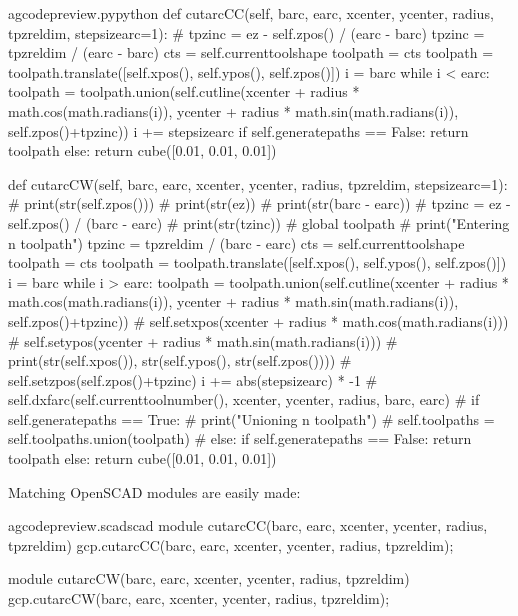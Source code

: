 \documentclass{ltxdoc}
\begin{document}
\lstset{firstnumber=\thegcpy}
\begin{writecode}{a}{gcodepreview.py}{python}
    def cutarcCC(self, barc, earc, xcenter, ycenter, radius, tpzreldim, stepsizearc=1):
#        tpzinc = ez - self.zpos() / (earc - barc)
        tpzinc = tpzreldim / (earc - barc)
        cts = self.currenttoolshape
        toolpath = cts
        toolpath = toolpath.translate([self.xpos(), self.ypos(), self.zpos()])
        i = barc
        while i < earc: 
            toolpath = toolpath.union(self.cutline(xcenter + radius * math.cos(math.radians(i)), ycenter + radius * math.sin(math.radians(i)), self.zpos()+tpzinc))
            i += stepsizearc
        if self.generatepaths == False:
            return toolpath
        else:
            return cube([0.01, 0.01, 0.01])

    def cutarcCW(self, barc, earc, xcenter, ycenter, radius, tpzreldim, stepsizearc=1):
#        print(str(self.zpos()))
#        print(str(ez))
#        print(str(barc - earc))
#        tpzinc = ez - self.zpos() / (barc - earc)
#        print(str(tzinc))
#        global toolpath
#        print("Entering n toolpath")
        tpzinc = tpzreldim / (barc - earc)
        cts = self.currenttoolshape
        toolpath = cts
        toolpath = toolpath.translate([self.xpos(), self.ypos(), self.zpos()])
        i = barc
        while i > earc: 
            toolpath = toolpath.union(self.cutline(xcenter + radius * math.cos(math.radians(i)), ycenter + radius * math.sin(math.radians(i)), self.zpos()+tpzinc))
#            self.setxpos(xcenter + radius * math.cos(math.radians(i)))
#            self.setypos(ycenter + radius * math.sin(math.radians(i)))
#            print(str(self.xpos()), str(self.ypos(), str(self.zpos())))
#            self.setzpos(self.zpos()+tpzinc)
            i += abs(stepsizearc) * -1
#        self.dxfarc(self.currenttoolnumber(), xcenter, ycenter, radius, barc, earc)
#        if self.generatepaths == True:
#            print("Unioning n toolpath")
#            self.toolpaths = self.toolpaths.union(toolpath)
#        else:
        if self.generatepaths == False:
            return toolpath
        else:
            return cube([0.01, 0.01, 0.01])

\end{writecode}
\addtocounter{gcpy}{45}

Matching OpenSCAD modules are easily made:

\lstset{firstnumber=\thegcpscad}
\begin{writecode}{a}{gcodepreview.scad}{scad}
module cutarcCC(barc, earc, xcenter, ycenter, radius, tpzreldim){
    gcp.cutarcCC(barc, earc, xcenter, ycenter, radius, tpzreldim);
}

module cutarcCW(barc, earc, xcenter, ycenter, radius, tpzreldim){
    gcp.cutarcCW(barc, earc, xcenter, ycenter, radius, tpzreldim);
}

\end{writecode}
\addtocounter{gcpscad}{8}
\end{document}
